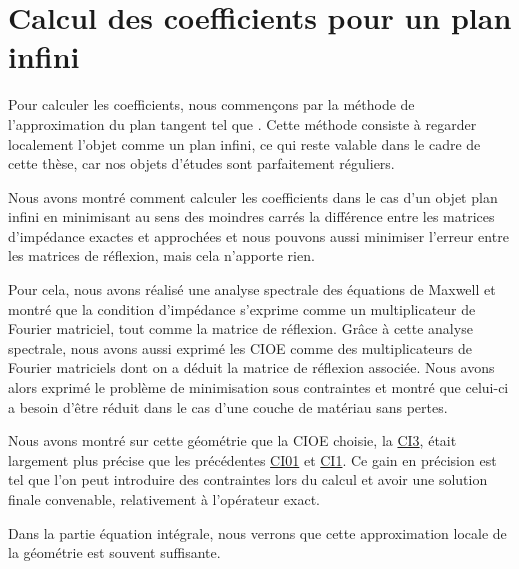 \chapter{Calcul des coefficients pour un plan infini}
\label{sec:plan}
\minitoc
\newpage
{}
Pour calculer les coefficients, nous commençons par la méthode de l'approximation du plan tangent tel que \cite{hoppe_impedance_1995,marceaux_high-order_2000,aubakirov_electromagnetic_2014}. Cette méthode consiste à regarder localement l'objet comme un plan infini, ce qui reste valable dans le cadre de cette thèse, car nos objets d'études sont parfaitement réguliers.









Nous avons montré comment calculer les coefficients dans le cas d'un objet plan infini en minimisant au sens des moindres carrés la différence entre les matrices d'impédance exactes et approchées et  nous pouvons aussi minimiser l'erreur entre les matrices de réflexion, mais cela n'apporte rien.

Pour cela, nous avons réalisé une analyse spectrale des équations de Maxwell et montré que la condition d'impédance s'exprime comme un multiplicateur de Fourier matriciel, tout comme la matrice de réflexion. Grâce à cette analyse spectrale, nous avons aussi exprimé les CIOE comme des multiplicateurs de Fourier matriciels dont on a déduit la matrice de réflexion associée. Nous avons alors exprimé le problème de minimisation sous contraintes et montré que celui-ci a besoin d'être réduit dans le cas d'une couche de matériau sans pertes.

Nous avons montré sur cette géométrie que la CIOE choisie, la \hyperlink{ci3}{CI3}, était largement plus précise que les précédentes \hyperlink{ci01}{CI01} et \hyperlink{ci1}{CI1}. Ce gain en précision est tel que l'on peut introduire des contraintes lors du calcul et avoir une solution finale convenable, relativement à l'opérateur exact.

Dans la partie équation intégrale, nous verrons que cette approximation locale de la géométrie est souvent suffisante.
